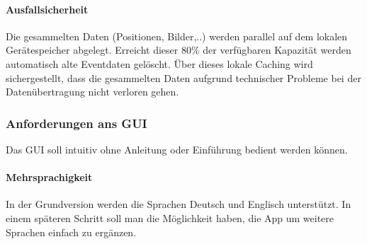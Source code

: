 \paragraph{Ausfallsicherheit}
Die gesammelten Daten (Positionen, Bilder,..) werden parallel auf dem lokalen Gerätespeicher abgelegt. Erreicht dieser 80\% der verfügbaren Kapazität werden automatisch alte Eventdaten gelöscht. Über dieses lokale Caching wird sichergestellt, dass die  gesammelten Daten aufgrund technischer Probleme bei der Datenübertragung nicht verloren gehen. 
\subsubsection{Anforderungen ans GUI}
Das GUI soll intuitiv ohne Anleitung oder Einführung bedient werden können. 
\paragraph{Mehrsprachigkeit}
In der Grundversion werden die Sprachen Deutsch und Englisch unterstützt. In einem späteren Schritt soll man die Möglichkeit haben, die App um weitere Sprachen einfach zu ergänzen.

